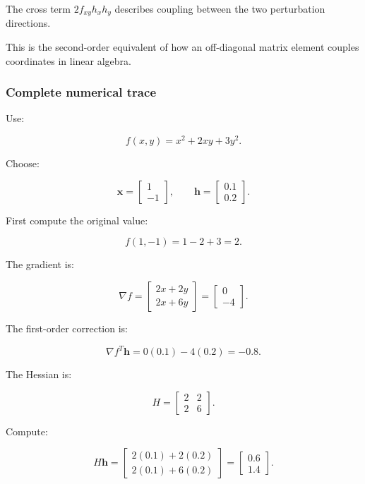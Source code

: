 The cross term \(2f_{xy}h_xh_y\) describes coupling between the two perturbation directions.

This is the second-order equivalent of how an off-diagonal matrix element couples coordinates in linear algebra.

\subsubsection{Complete numerical trace}\label{02-foundations-ii-ch021-complete-numerical-trace}

\hypertarget{02-foundations-ii-ch021-complete-numerical-trace}{}

Use:

\[
f(x,y)=x^2+2xy+3y^2.
\]

Choose:

\[
\mathbf x= \begin{bmatrix} 1\\-1 \end{bmatrix}, \qquad \mathbf h= \begin{bmatrix} 0.1\\0.2 \end{bmatrix}.
\]

First compute the original value:

\[
f(1,-1)=1-2+3=2.
\]

The gradient is:

\[
\nabla f= \begin{bmatrix} 2x+2y\\ 2x+6y \end{bmatrix} = \begin{bmatrix} 0\\-4 \end{bmatrix}.
\]

The first-order correction is:

\[
\nabla f^T\mathbf h =0(0.1)-4(0.2)=-0.8.
\]

The Hessian is:

\[
H= \begin{bmatrix} 2&2\\2&6 \end{bmatrix}.
\]

Compute:

\[
H\mathbf h= \begin{bmatrix} 2(0.1)+2(0.2)\\ 2(0.1)+6(0.2) \end{bmatrix} = \begin{bmatrix} 0.6\\1.4 \end{bmatrix}.
\]


